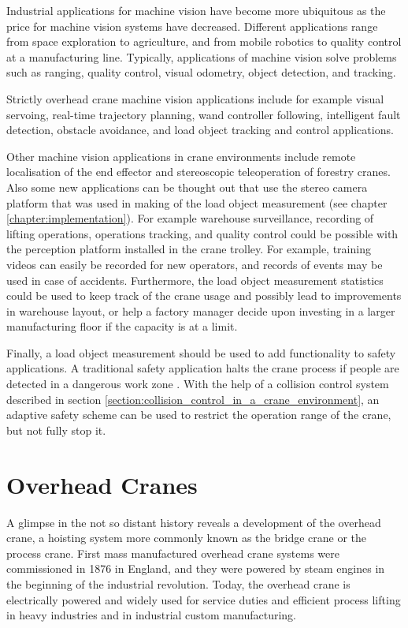 \documentclass[12pt,a4paper,oneside,pdftex]{report}
\begin{document}
Industrial applications for machine vision have become more ubiquitous as the price for machine vision systems have decreased. Different applications range from space exploration to agriculture, and from mobile robotics to quality control at a manufacturing line. Typically, applications of machine vision solve problems such as ranging, quality control, visual odometry, object detection, and tracking.

Strictly overhead crane machine vision applications include for example visual servoing\citep{Lun-Hui14}, real-time trajectory planning\citep{Kaneshige05}, wand controller following\citep{Peng09}, intelligent fault detection\citep{Rahmani10}, obstacle avoidance\citep{Nagai11}, and load object tracking and control applications\citep{Yoshida06}. 

Other machine vision applications in crane environments include remote localisation of the end effector \citep{Hainsworth94} and stereoscopic teleoperation of forestry cranes\citep{Westerberg08}. Also some new applications can be thought out that use the stereo camera platform that was used in making of the load object measurement (see chapter \ref{chapter:implementation}). For example warehouse surveillance, recording of lifting operations, operations tracking, and quality control could be possible with the perception platform installed in the crane trolley. For example, training videos can easily be recorded for new operators, and records of events may be used in case of accidents. Furthermore, the load object measurement statistics could be used to keep track of the crane usage and possibly lead to improvements in warehouse layout, or help a factory manager decide upon investing in a larger manufacturing floor if the capacity is at a limit.

Finally, a load object measurement should be used to add functionality to safety applications. A traditional safety application halts the crane process if people are detected in a dangerous work zone \cite{Raula11}. With the help of a collision control system described in section \ref{section:collision_control_in_a_crane_environment}, an adaptive safety scheme can be used to restrict the operation range of the crane, but not fully stop it.

\section{Overhead Cranes}
\label{section:overhead_cranes}
A glimpse in the not so distant history reveals a development of the overhead crane, a hoisting system more commonly known as the bridge crane or the process crane. First mass manufactured overhead crane systems were commissioned in 1876 in England, and they were powered by steam engines in the beginning of the industrial revolution. Today, the overhead crane is electrically powered and widely used for service duties and efficient process lifting in heavy industries and in industrial custom manufacturing.
\end{document}

